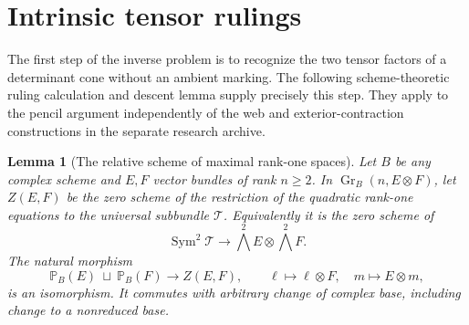 \documentclass[11pt,reqno]{amsart}
\numberwithin{equation}{section}
\newtheorem{lemma}[theorem]{Lemma}
\theoremstyle{definition}\newtheorem{definition}[theorem]{Definition}
\theoremstyle{remark}\newtheorem{remark}[theorem]{Remark}
\newcommand{\Pj}{\mathbb P}\newcommand{\A}{\mathbb A}
\DeclareMathOperator{\Sym}{Sym}\DeclareMathOperator{\Gr}{Gr}
\begin{document}

\section{Intrinsic tensor rulings}
\label{sec:ruling-foundations-v143}
The first step of the inverse problem is to recognize the two tensor
factors of a determinant cone without an ambient marking.  The following
scheme-theoretic ruling calculation and descent lemma supply precisely
this step.  They apply to the pencil argument independently of the web
and exterior-contraction constructions in the separate research archive.

\begin{lemma}[The relative scheme of maximal rank-one spaces]
\label{lem:rank-one-fano-scheme}
Let \(B\) be any complex scheme and \(E,F\) vector bundles of
rank \(n\ge2\).  In \(\Gr_B(n,E\otimes F)\), let
\(Z(E,F)\) be the zero scheme of the restriction of the quadratic
rank-one equations to the universal subbundle \(\mathcal T\).
Equivalently it is the zero scheme of
\[
 \Sym^2\mathcal T\longrightarrow
              \bigwedge^2E\otimes\bigwedge^2F.
\]
The natural morphism
\begin{equation}\label{eq:fano-rank-one-scheme}
 \Pj_B(E)\ \sqcup\ \Pj_B(F)\longrightarrow Z(E,F),
 \qquad \ell\mapsto\ell\otimes F,
 \quad m\mapsto E\otimes m,
\end{equation}
is an isomorphism.  It commutes with arbitrary change of complex
base, including change to a nonreduced base.
\end{lemma}
\end{document}
